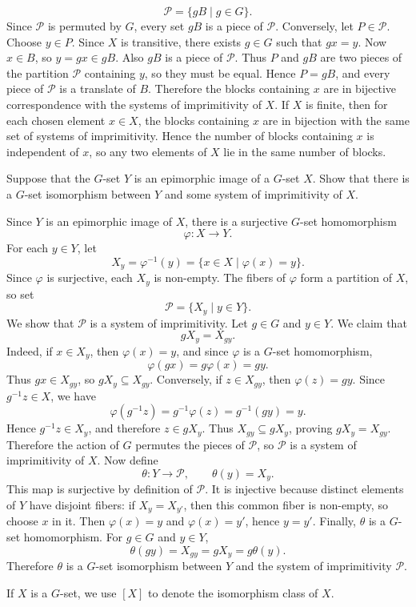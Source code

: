\documentclass[../Odyssey_Project.tex]{subfiles}
\begin{document}
\begin{solution}
    \[
        \mathcal{P} = \{gB \mid g \in G\}.
    \]
    Since $\mathcal{P}$ is permuted by $G$, every set $gB$ is a piece of $\mathcal{P}$. Conversely, let $P \in \mathcal{P}$. Choose $y \in P$. Since $X$ is transitive, there exists $g \in G$ such that $gx = y$. Now $x \in B$, so $y = gx \in gB$. Also $gB$ is a piece of $\mathcal{P}$. Thus $P$ and $gB$ are two pieces of the partition $\mathcal{P}$ containing $y$, so they must be equal. Hence $P = gB$, and every piece of $\mathcal{P}$ is a translate of $B$.
    Therefore the blocks containing $x$ are in bijective correspondence with the systems of imprimitivity of $X$.
    If $X$ is finite, then for each chosen element $x \in X$, the blocks containing $x$ are in bijection with the same set of systems of imprimitivity. Hence the number of blocks containing $x$ is independent of $x$, so any two elements of $X$ lie in the same number of blocks.
\end{solution}

\begin{exercise}
\label{ex:3.10}
Suppose that the $G$-set $Y$ is an epimorphic image of a $G$-set $X$. Show that there is a $G$-set isomorphism between $Y$ and some system of imprimitivity of $X$.
\end{exercise}
\begin{solution}
    Since $Y$ is an epimorphic image of $X$, there is a surjective $G$-set homomorphism
    \[
        \varphi \colon X \to Y.
    \]
    For each $y \in Y$, let
    \[
        X_y = \varphi^{-1}(y) = \{x \in X \mid \varphi(x) = y\}.
    \]
    Since $\varphi$ is surjective, each $X_y$ is non-empty. The fibers of $\varphi$ form a partition of $X$, so set
    \[
        \mathcal{P} = \{X_y \mid y \in Y\}.
    \]
    We show that $\mathcal{P}$ is a system of imprimitivity. Let $g \in G$ and $y \in Y$. We claim that
    \[
        gX_y = X_{gy}.
    \]
    Indeed, if $x \in X_y$, then $\varphi(x)=y$, and since $\varphi$ is a $G$-set homomorphism,
    \[
        \varphi(gx) = g\varphi(x) = gy.
    \]
    Thus $gx \in X_{gy}$, so $gX_y \subseteq X_{gy}$.
    Conversely, if $z \in X_{gy}$, then $\varphi(z)=gy$. Since $g^{-1}z \in X$, we have
    \[
        \varphi(g^{-1}z) = g^{-1}\varphi(z) = g^{-1}(gy)=y.
    \]
    Hence $g^{-1}z \in X_y$, and therefore $z \in gX_y$. Thus $X_{gy} \subseteq gX_y$, proving $gX_y=X_{gy}$.
    Therefore the action of $G$ permutes the pieces of $\mathcal{P}$, so $\mathcal{P}$ is a system of imprimitivity of $X$.
    Now define
    \[
        \theta \colon Y \to \mathcal{P}, \qquad \theta(y)=X_y.
    \]
    This map is surjective by definition of $\mathcal{P}$. It is injective because distinct elements of $Y$ have disjoint fibers: if $X_y=X_{y'}$, then this common fiber is non-empty, so choose $x$ in it. Then $\varphi(x)=y$ and $\varphi(x)=y'$, hence $y=y'$.
    Finally, $\theta$ is a $G$-set homomorphism. For $g \in G$ and $y \in Y$,
    \[
        \theta(gy)=X_{gy}=gX_y=g\theta(y).
    \]
    Therefore $\theta$ is a $G$-set isomorphism between $Y$ and the system of imprimitivity $\mathcal{P}$.
\end{solution}
If $X$ is a $G$-set, we use $[X]$ to denote the isomorphism class of $X$.
\end{document}
